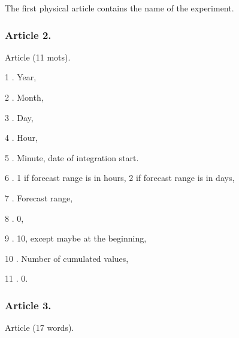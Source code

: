 The first physical article  contains the name of the experiment.
\subsubsection*{Article 2.}

Article  (11 mots).
\begin{description}
        \item{1 .} Year,
        \item{2 .} Month,
        \item{3 .} Day,
        \item{4 .} Hour,
        \item{5 .} Minute, date of integration start.
        \item{6 .} 1 if forecast range is in hours, 2 if forecast range is in days, 
        \item{7 .} Forecast range,
        \item{8 .} 0,
        \item{9 .} 10, except maybe at the beginning,
        \item{10 .} Number of cumulated values,
        \item{11 .} 0.
\end{description}

\subsubsection*{Article 3.}

Article  (17 words).

